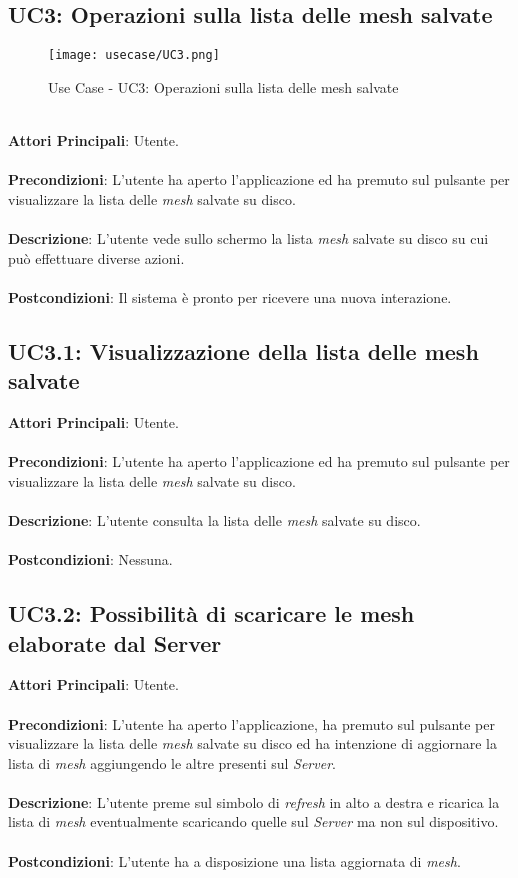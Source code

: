 \subsection{UC3: Operazioni sulla lista delle mesh salvate}
\begin{figure}[H] 
    \centering 
    \texttt{[image: usecase/UC3.png]} 
    \caption{Use Case - UC3: Operazioni sulla lista delle mesh salvate}
\end{figure}
\ \\
\textbf{Attori Principali}: Utente.
\\\\ \textbf{Precondizioni}: L'utente ha aperto l'applicazione ed ha premuto sul pulsante per visualizzare la lista delle \emph{mesh} salvate su disco.
\\\\ \textbf{Descrizione}: L'utente vede sullo schermo la lista \emph{mesh} salvate su disco su cui può effettuare diverse azioni.
\\\\ \textbf{Postcondizioni}: Il sistema è pronto per ricevere una nuova interazione.




\subsection{UC3.1: Visualizzazione della lista delle mesh salvate}
\textbf{Attori Principali}: Utente.
\\\\ \textbf{Precondizioni}: L'utente ha aperto l'applicazione ed ha premuto sul pulsante per visualizzare la lista delle \emph{mesh} salvate su disco.
\\\\ \textbf{Descrizione}:  L'utente consulta la lista delle \emph{mesh} salvate su disco.
\\\\ \textbf{Postcondizioni}: Nessuna.

\subsection{UC3.2: Possibilità di scaricare le mesh elaborate dal Server}
\textbf{Attori Principali}: Utente.
\\\\ \textbf{Precondizioni}: L'utente ha aperto l'applicazione, ha premuto sul pulsante per visualizzare la lista delle \emph{mesh} salvate su disco ed ha intenzione di aggiornare la lista di \emph{mesh} aggiungendo le altre presenti sul \emph{Server}.
\\\\ \textbf{Descrizione}: L'utente preme sul simbolo di \emph{refresh} in alto a destra e ricarica la lista di \emph{mesh} eventualmente scaricando quelle sul \emph{Server} ma non sul dispositivo.
\\\\ \textbf{Postcondizioni}: L'utente ha a disposizione una lista aggiornata di \emph{mesh}.

